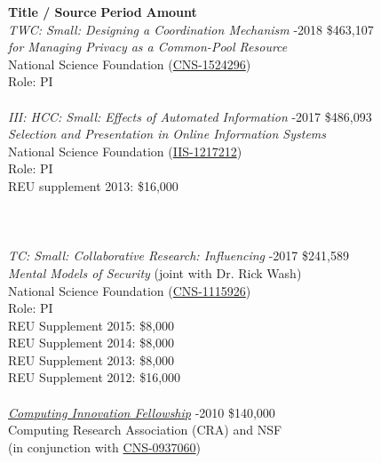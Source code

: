 \documentclass[9pt]{extarticle}
\begin{document}
\begin{tabbing}
\textbf{Title / Source} \hspace{2.75in}\= \textbf{Period} \hspace{0.5in}\= \textbf{Amount} \\

\emph{TWC: Small: Designing a Coordination Mechanism} -2018 \> \$463,107 \\
\emph{for Managing Privacy as a Common-Pool Resource} \\ 
National Science Foundation (\href{http://www.nsf.gov/awardsearch/showAward?AWD_ID=1524296}{CNS-1524296}) \\ 
Role: PI \\\\

\emph{III: HCC: Small: Effects of Automated Information} -2017 \> \$486,093 \\
\emph{Selection and Presentation in Online Information Systems} \\ 
National Science Foundation (\href{http://nsf.gov/awardsearch/showAward.do?AwardNumber=1217212}{IIS-1217212}) \\ 
Role: PI \\
	\hspace{1cm}REU supplement 2013: \$16,000 \\\\\\\\ %

\emph{TC: Small: Collaborative Research: Influencing} -2017 \> \$241,589 \\
\emph{Mental Models of Security} (joint with Dr. Rick Wash) \\ 
National Science Foundation (\href{http://nsf.gov/awardsearch/showAward.do?AwardNumber=1115926}{CNS-1115926}) \\ Role: PI \\
	\hspace{1cm}REU Supplement 2015: \$8,000 \\
	\hspace{1cm}REU Supplement 2014: \$8,000 \\
	\hspace{1cm}REU Supplement 2013: \$8,000 \\
	\hspace{1cm}REU Supplement 2012: \$16,000 \\\\

\emph{\href{http://cra.org/ccc/leadership-development/cifellows/}{Computing Innovation Fellowship}}  -2010 \> \$140,000 \\ 
Computing Research Association (CRA) and NSF \\ 
(in conjunction with \href{http://nsf.gov/awardsearch/showAward?AWD_ID=0937060}{CNS-0937060})
\end{tabbing}
\end{document}
